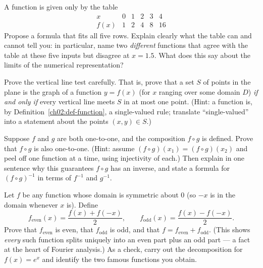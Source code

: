 \begin{exercise}
\label{ch02:exc-representations}
A function is given only by the table
\[
  \begin{array}{c|ccccc}
    x & 0 & 1 & 2 & 3 & 4 \\ \hline
    f(x) & 1 & 2 & 4 & 8 & 16
  \end{array}
\]
Propose a formula that fits all five rows. Explain clearly what the table can and
cannot tell you: in particular, name two \emph{different} functions that agree with
the table at these five inputs but disagree at $x = 1.5$. What does this say about
the limits of the numerical representation?
\end{exercise}

\begin{exercise}
\label{ch02:exc-proof-vlt}
Prove the vertical line test carefully. That is, prove that a set $S$ of points in
the plane is the graph of a function $y = f(x)$ (for $x$ ranging over some domain
$D$) \emph{if and only if} every vertical line meets $S$ in at most one point.
(Hint: a function is, by Definition~\ref{ch02:def-function}, a single-valued
rule; translate ``single-valued'' into a statement about the points $(x,y)\in S$.)
\end{exercise}

\begin{exercise}
\label{ch02:exc-proof-injective}
Suppose $f$ and $g$ are both one-to-one, and the composition $f \circ g$ is
defined. Prove that $f \circ g$ is also one-to-one. (Hint: assume
$(f\circ g)(x_1) = (f\circ g)(x_2)$ and peel off one function at a time, using
injectivity of each.) Then explain in one sentence why this guarantees $f \circ g$
has an inverse, and state a formula for $(f \circ g)^{-1}$ in terms of $f^{-1}$ and
$g^{-1}$.
\end{exercise}

\begin{exercise}
\label{ch02:exc-proof-decomp}
Let $f$ be any function whose domain is symmetric about $0$ (so $-x$ is in the
domain whenever $x$ is). Define
\[
  f_{\text{even}}(x) = \frac{f(x) + f(-x)}{2}, \qquad
  f_{\text{odd}}(x) = \frac{f(x) - f(-x)}{2}.
\]
Prove that $f_{\text{even}}$ is even, that $f_{\text{odd}}$ is odd, and that
$f = f_{\text{even}} + f_{\text{odd}}$. (This shows \emph{every} such function
splits uniquely into an even part plus an odd part --- a fact at the heart of
Fourier analysis.) As a check, carry out the decomposition for $f(x) = e^x$ and
identify the two famous functions you obtain.
\end{exercise}
